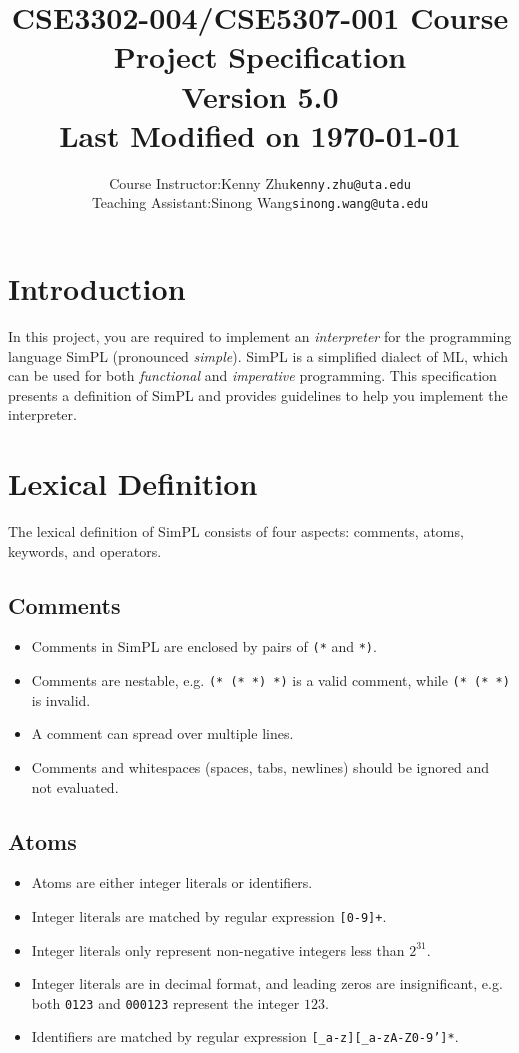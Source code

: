 \documentclass{article}
\title{
  \textbf{CSE3302-004/CSE5307-001 Course Project Specification} \\
  \textbf{\normalsize Version 5.0} \\
  {\normalsize Last Modified on \today}}
\author{
  \normalsize
  \begin{tabular}{rcl}
    Course Instructor: & Kenny Zhu & \texttt{kenny.zhu@uta.edu} \\
    Teaching Assistant: & Sinong Wang & \texttt{sinong.wang@uta.edu} \\
  \end{tabular}}
\date{}
\begin{document}
\maketitle

\section{Introduction}

In this project, you are required to implement an \emph{interpreter} for the
programming language SimPL (pronounced \emph{simple}).  SimPL is a simplified
dialect of ML, which can be used for both \emph{functional} and
\emph{imperative} programming.  This specification presents a definition of
SimPL and provides guidelines to help you implement the interpreter.

\section{Lexical Definition}

The lexical definition of SimPL consists of four aspects: comments, atoms, keywords, and operators.

\subsection{Comments}

\begin{itemize}
  \item Comments in SimPL are enclosed by pairs of \texttt{(*} and \texttt{*)}.
  \item Comments are nestable, e.g. \texttt{(*  (*  *)  *)} is a valid comment, while \texttt{(*  (*  *)} is invalid.
  \item A comment can spread over multiple lines.
  \item Comments and whitespaces (spaces, tabs, newlines) should be ignored and not evaluated.
\end{itemize}

\subsection{Atoms}

\begin{itemize}
  \item Atoms are either integer literals or identifiers.
  \item Integer literals are matched by regular expression \texttt{[0-9]+}.
  \item Integer literals only represent non-negative integers less than $2^{31}$.
  \item Integer literals are in decimal format, and leading zeros are insignificant, e.g. both \texttt{0123} and \texttt{000123} represent the integer $123$.
  \item Identifiers are matched by regular expression \texttt{[\_a-z][\_a-zA-Z0-9']*}.
\end{itemize}
\end{document}
